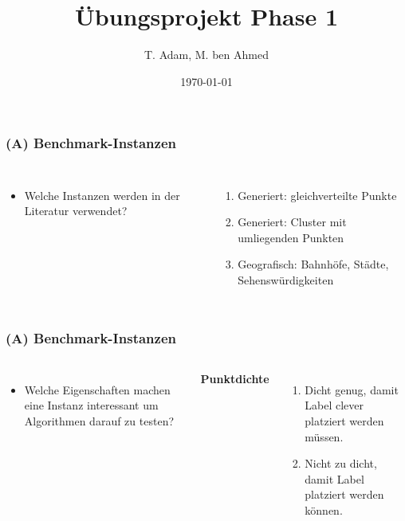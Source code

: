 \documentclass[aspectratio=169]{beamer}
\title[Übungsprojekt Phase 1]{Übungsprojekt Phase 1} %
\author{T. Adam, M. ben Ahmed} %
\institute[UOS] %
{

Universität Osnabrück \\ %

\medskip
\textit{Æ} %


}
\date{\today} %
\begin{document}
\begin{frame}
\titlepage %
\end{frame}





\begin{frame}
	\frametitle{(A) Benchmark-Instanzen}
	\begin{columns}[c] %
	
	\begin{itemize}
		\item Welche Instanzen werden in der Literatur verwendet? \pause
		
	\end{itemize}
	
	\begin{enumerate}
	\item Generiert: gleichverteilte Punkte\pause
	\item Generiert: Cluster mit umliegenden Punkten\pause
	\item Geografisch: Bahnhöfe, Städte, Sehenswürdigkeiten
	
	\end{enumerate}
	

	\end{columns}
	\end{frame}

\begin{frame}
	\frametitle{(A) Benchmark-Instanzen}
	\begin{columns}[c] %
	
	\begin{itemize}
		\item Welche Eigenschaften machen eine Instanz interessant um Algorithmen darauf zu testen? \pause
	\end{itemize}
	
	\textbf{Punktdichte}
	\begin{enumerate}

	\item Dicht genug, damit Label clever platziert werden müssen. \pause
	\item Nicht zu dicht, damit Label platziert werden können. 
	\end{enumerate}
	

	\end{columns}
	\end{frame}
\end{document}
